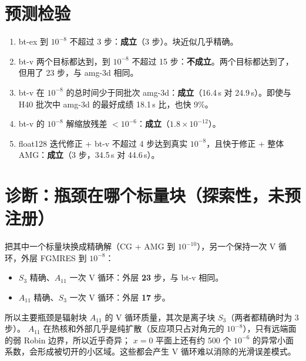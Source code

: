 \documentclass[11pt,a4paper]{ctexart}
\begin{document}
\section{预测检验}
\begin{enumerate}
\item bt-ex 到 $10^{-8}$ 不超过 3 步：\textbf{成立}（3 步）。块近似几乎精确。
\item bt-v 两个目标都达到，到 $10^{-8}$ 不超过 15 步：\textbf{不成立}。两个目标都达到了，但用了 23 步，与 amg-3d 相同。
\item bt-v 在 $10^{-8}$ 的总时间少于同批次 amg-3d：\textbf{成立}（16.4\,s 对 24.9\,s）。即使与 H40 批次中 amg-3d 的最好成绩 18.1\,s 比，也快 9\%。
\item bt-v 的 $10^{-8}$ 解缩放残差 $<10^{-6}$：\textbf{成立}（$1.8\times10^{-12}$）。
\item float128 迭代修正 + bt-v 不超过 4 步达到真实 $10^{-8}$，且快于修正 + 整体 AMG：\textbf{成立}（3 步，34.5\,s 对 44.6\,s）。
\end{enumerate}

\section{诊断：瓶颈在哪个标量块（探索性，未预注册）}
把其中一个标量块换成精确解（CG + AMG 到 $10^{-10}$），另一个保持一次 V 循环，外层 FGMRES 到 $10^{-8}$：
\begin{itemize}
\item $S_3$ 精确、$A_{11}$ 一次 V 循环：外层 \textbf{23} 步，与 bt-v 相同。
\item $A_{11}$ 精确、$S_3$ 一次 V 循环：外层 \textbf{17} 步。
\end{itemize}
所以主要瓶颈是辐射块 $A_{11}$ 的 V 循环质量，其次是离子块 $S_3$（两者都精确时为 3 步）。
$A_{11}$ 在热核和外部几乎是纯扩散（反应项只占对角元的 $10^{-8}$），只有远端面的弱 Robin 边界，所以近乎奇异；
$x=0$ 平面上还有约 500 个 $10^{-6}$ 的异常小面系数，会形成被切开的小区域。这些都会产生 V 循环难以消除的光滑误差模式。
\end{document}
